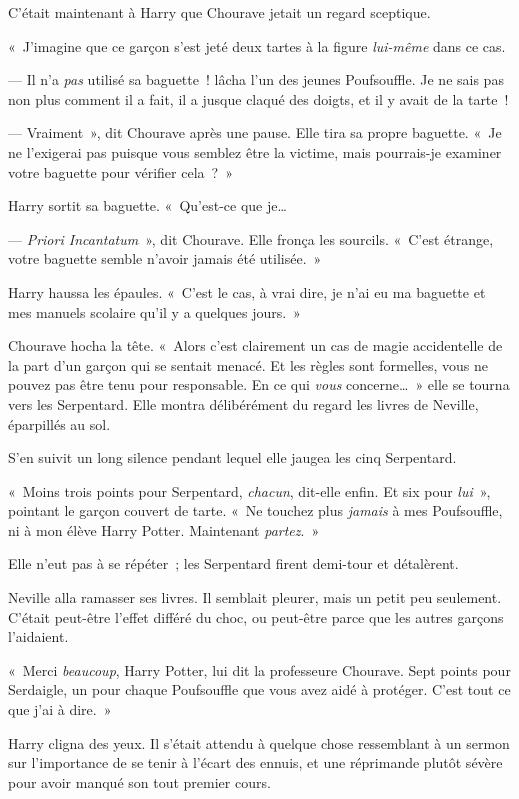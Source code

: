 C'était maintenant à Harry que Chourave jetait un regard sceptique.

«~J'imagine que ce garçon s'est jeté deux tartes à la figure \emph{lui-même} dans ce cas.

--- Il n'a \emph{pas} utilisé sa baguette~! lâcha l'un des jeunes Poufsouffle.
Je ne sais pas non plus comment il a fait, il a jusque claqué des doigts, et il y avait de la tarte~!

--- Vraiment~», dit Chourave après une pause.
Elle tira sa propre baguette.
«~Je ne l'exigerai pas puisque vous semblez être la victime, mais pourrais-je examiner votre baguette pour vérifier cela~?~»

Harry sortit sa baguette.
«~Qu'est-ce que je…

--- \emph{Priori Incantatum}~», dit Chourave.
Elle fronça les sourcils.
«~C'est étrange, votre baguette semble n'avoir jamais été utilisée.~»

Harry haussa les épaules. «~C'est le cas, à vrai dire, je n'ai eu ma baguette et mes manuels scolaire qu'il y a quelques jours.~»

Chourave hocha la tête.
«~Alors c'est clairement un cas de magie accidentelle de la part d'un garçon qui se sentait menacé.
Et les règles sont formelles, vous ne pouvez pas être tenu pour responsable.
En ce qui \emph{vous} concerne…~» elle se tourna vers les Serpentard.
Elle montra délibérément du regard les livres de Neville, éparpillés au sol.

S'en suivit un long silence pendant lequel elle jaugea les cinq Serpentard.

«~Moins trois points pour Serpentard, \emph{chacun}, dit-elle enfin.
Et six pour \emph{lui}~», pointant le garçon couvert de tarte.
«~Ne touchez plus \emph{jamais} à mes Poufsouffle, ni à mon élève Harry Potter.
Maintenant \emph{partez}.~»

Elle n'eut pas à se répéter~; les Serpentard firent demi-tour et détalèrent.

Neville alla ramasser ses livres.
Il semblait pleurer, mais un petit peu seulement.
C'était peut-être l'effet différé du choc, ou peut-être parce que les autres garçons l'aidaient.

«~Merci \emph{beaucoup}, Harry Potter, lui dit la professeure Chourave.
Sept points pour Serdaigle, un pour chaque Poufsouffle que vous avez aidé à protéger.
C'est tout ce que j'ai à dire.~»

Harry cligna des yeux.
Il s'était attendu à quelque chose ressemblant à un sermon sur l'importance de se tenir à l'écart des ennuis, et une réprimande plutôt sévère pour avoir manqué son tout premier cours.

